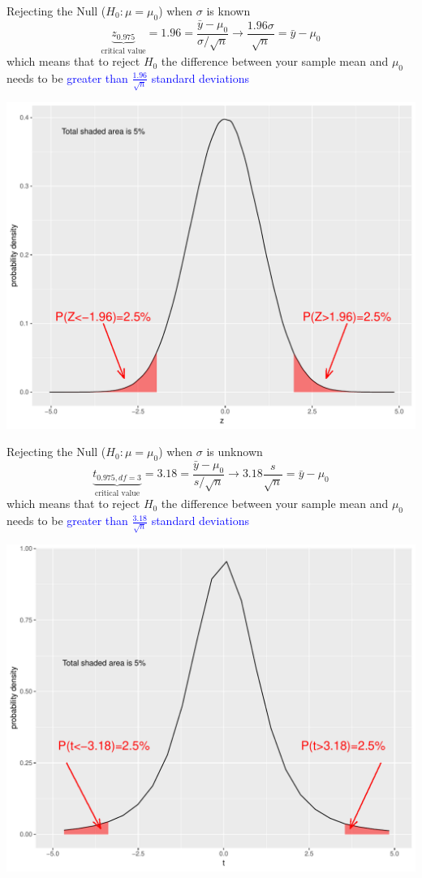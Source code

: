 \documentclass{beamer}\usepackage[]{graphicx}\usepackage[]{color}
\newenvironment{knitrout}{}{} %
\newcommand{\blue}[1]{\textcolor{blue}{#1}}
\begin{document}
\begin{frame}[fragile]{Rejecting the Null ($H_0: \mu = \mu_0$) when $\sigma$ is known}
\[ \underbrace{z_{0.975}}_{\textrm{critical value}}=1.96 = \frac{\bar{y}-\mu_0}{\sigma/\sqrt{n}} \rightarrow \frac{1.96 \sigma}{\sqrt{n}} = \bar{y}-\mu_0   \] which means that to reject $H_0$ the difference between your sample mean and $\mu_0$ needs to be \blue{greater than $\frac{1.96}{\sqrt{n}}$ standard deviations} \pause
\begin{knitrout}\scriptsize
{}\color{fgcolor}

{\centering \includegraphics[width=.6\linewidth]{figure/unnamed-chunk-8-1} 

}



\end{knitrout}
\end{frame}



\begin{frame}[fragile]{Rejecting the Null ($H_0: \mu = \mu_0$) when $\sigma$ is unknown}
\[ \underbrace{t_{0.975,df=3}}_{\textrm{critical value}}=3.18 = \frac{\bar{y}-\mu_0}{s/\sqrt{n}} \rightarrow 3.18 \frac{s}{\sqrt{n}} = \bar{y}-\mu_0   \] which means that to reject $H_0$ the difference between your sample mean and $\mu_0$ needs to be \blue{greater than $\frac{3.18}{\sqrt{n}}$ standard deviations} \pause
\begin{knitrout}\scriptsize
{}\color{fgcolor}

{\centering \includegraphics[width=.6\linewidth]{figure/unnamed-chunk-9-1} 

}



\end{knitrout}
\end{frame}
\end{document}
